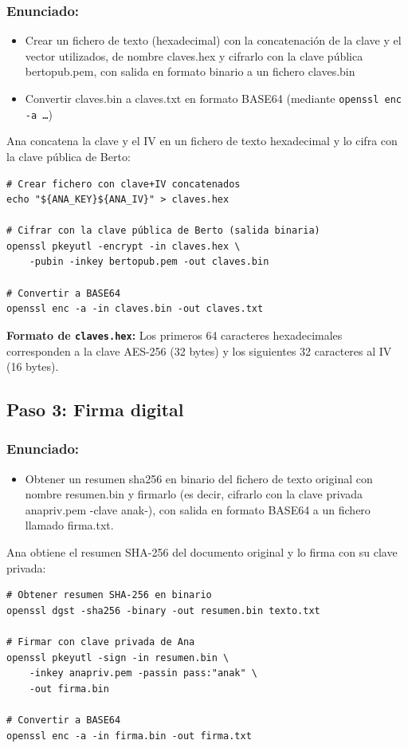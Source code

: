 \subsubsection{Enunciado:}
\begin{itemize}[label=\textbullet]
    \item Crear un fichero de texto (hexadecimal) con la concatenación de la clave y el vector utilizados, de nombre claves.hex y cifrarlo con la clave pública bertopub.pem, con salida en formato binario a un fichero claves.bin
    \item Convertir claves.bin a claves.txt en formato BASE64 (mediante \texttt{openssl enc -a \dots})
\end{itemize}
Ana concatena la clave y el IV en un fichero de texto hexadecimal y lo cifra con la clave pública de Berto:

\begin{lstlisting}[caption=Cifrado de claves simétricas con RSA]
# Crear fichero con clave+IV concatenados
echo "${ANA_KEY}${ANA_IV}" > claves.hex

# Cifrar con la clave pública de Berto (salida binaria)
openssl pkeyutl -encrypt -in claves.hex \
    -pubin -inkey bertopub.pem -out claves.bin

# Convertir a BASE64
openssl enc -a -in claves.bin -out claves.txt
\end{lstlisting}

\textbf{Formato de \texttt{claves.hex}:} Los primeros 64 caracteres hexadecimales corresponden a la clave AES-256 (32 bytes) y los siguientes 32 caracteres al IV (16 bytes).

\subsection{Paso 3: Firma digital}
\subsubsection{Enunciado:}
\begin{itemize}[label=\textbullet]
    \item Obtener un resumen sha256 en binario del fichero de texto original con nombre resumen.bin y firmarlo (es decir, cifrarlo con la clave privada anapriv.pem -clave anak-), con salida en formato BASE64 a un fichero llamado firma.txt.
\end{itemize}
Ana obtiene el resumen SHA-256 del documento original y lo firma con su clave privada:

\begin{lstlisting}[caption=Firma digital del documento]
# Obtener resumen SHA-256 en binario
openssl dgst -sha256 -binary -out resumen.bin texto.txt

# Firmar con clave privada de Ana
openssl pkeyutl -sign -in resumen.bin \
    -inkey anapriv.pem -passin pass:"anak" \
    -out firma.bin

# Convertir a BASE64
openssl enc -a -in firma.bin -out firma.txt
\end{lstlisting}

